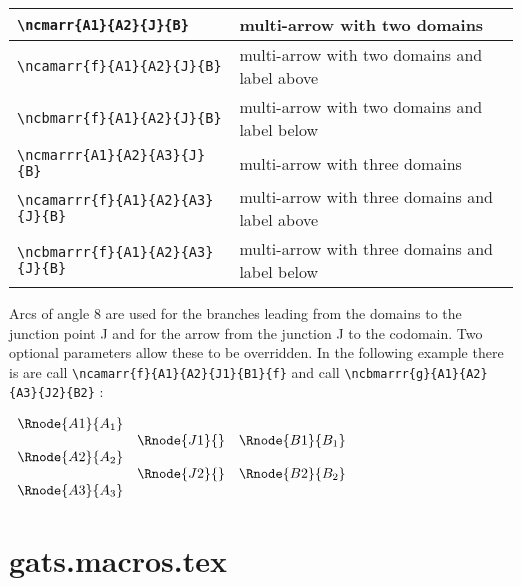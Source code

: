 \documentclass[10pt,a4paper]{article}
\begin{document}
\begin{table}[h]
	\centering
		\begin{tabular}{|l |  p{5cm} | }
		   \hline
		   \verb!\ncmarr{A1}{A2}{J}{B}! & multi-arrow with two domains \\
		    \hline
		   \verb!\ncamarr{f}{A1}{A2}{J}{B}! & multi-arrow with two domains and label above \\
		   \hline
		 	 \verb!\ncbmarr{f}{A1}{A2}{J}{B}! & multi-arrow with two domains and label below \\
		 	 \hline
		 	 \verb!\ncmarrr{A1}{A2}{A3}{J}{B}! & multi-arrow with three domains \\
		 	 \hline
		   \verb!\ncamarrr{f}{A1}{A2}{A3}{J}{B}! & multi-arrow with three domains and label above \\
		   \hline
		 	 \verb!\ncbmarrr{f}{A1}{A2}{A3}{J}{B}! & multi-arrow with three domains and label below \\
		 	 \hline
		\end{tabular}
\end{table}
Arcs of angle 8 are used for the branches leading from the domains to the junction point J and for the arrow from the junction J to the codomain.
Two optional parameters allow these to be overridden.
In the following example there is are call \verb!\ncamarr{f}{A1}{A2}{J1}{B1}{f}! and call
\verb!\ncbmarrr{g}{A1}{A2}{A3}{J2}{B2}! :
\setlength{\arraycolsep}{1cm}
\begin{center}
$
\begin{array}{cccc}
\Rnode{A1}{A_1}& & \\
                & \Rnode{J1}{}& \Rnode{B1}{B_1} \\
\Rnode{A2}{A_2}& & \\
                &  \Rnode{J2}{}& \Rnode{B2}{B_2} \\
\Rnode{A3}{A_3}& & \\
\end{array}
$

\end{center}
\setlength{\arraycolsep}{.2cm}

\newpage
\section{gats.macros.tex}
\end{document}
